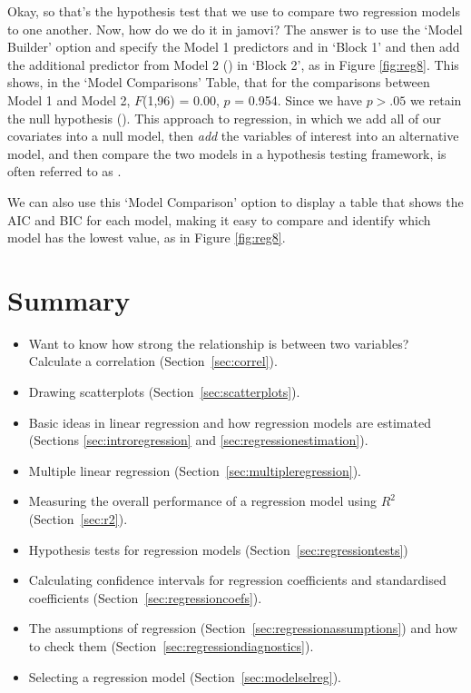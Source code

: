 Okay, so that's the hypothesis test that we use to compare two regression models to one another. Now, how do we do it in jamovi? The answer is to use the `Model Builder' option and specify the Model 1 predictors  and  in `Block 1' and then add the additional predictor from Model 2 () in `Block 2', as in Figure \ref{fig:reg8}. This shows, in the `Model Comparisons' Table, that for the comparisons between Model 1 and Model 2, $F$(1,96) = 0.00, $p$ = 0.954. Since we have $p>.05$ we retain the null hypothesis ().  This approach to regression, in which we add all of our covariates into a null model, then {\it add} the variables of interest into an alternative model, and then compare the two models in a hypothesis testing framework, is often referred to as .

We can also use this `Model Comparison' option to display a table that shows the AIC and BIC for each model, making it easy to compare and identify which model has the lowest value, as in Figure \ref{fig:reg8}.


\section{Summary}

\begin{itemize} \itemsep -2pt
\item Want to know how strong the relationship is between two variables? Calculate a correlation (Section~\ref{sec:correl}).
\item Drawing scatterplots (Section~\ref{sec:scatterplots}). 
\item Basic ideas in linear regression and how regression models are estimated (Sections \ref{sec:introregression} and \ref{sec:regressionestimation}).
\item Multiple linear regression (Section~\ref{sec:multipleregression}). 
\item Measuring the overall performance of a regression model using $R^2$ (Section~\ref{sec:r2}).
\item Hypothesis tests for regression models (Section~\ref{sec:regressiontests})
\item Calculating confidence intervals for regression coefficients and standardised coefficients (Section~\ref{sec:regressioncoefs}).
\item The assumptions of regression (Section~\ref{sec:regressionassumptions}) and how to check them (Section~\ref{sec:regressiondiagnostics}).
\item Selecting a regression model (Section~\ref{sec:modelselreg}).
\end{itemize}






